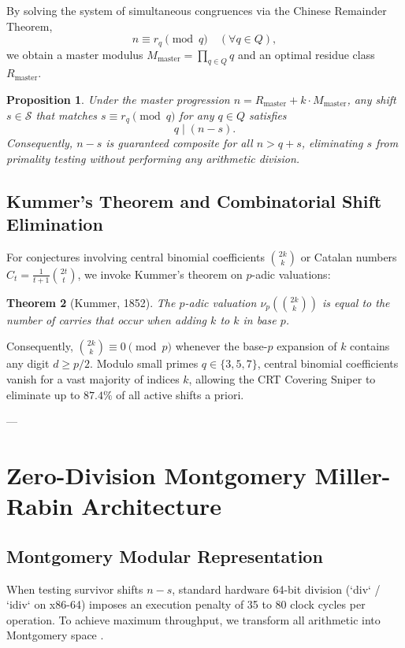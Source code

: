 \documentclass[11pt,a4paper]{article}
\newtheorem{theorem}{Theorem}[section]
\newtheorem{proposition}[theorem]{Proposition}
\theoremstyle{definition}
\theoremstyle{remark}
\begin{document}
By solving the system of simultaneous congruences via the Chinese Remainder Theorem,
\begin{equation}
n \equiv r_q \pmod q \quad (\forall q \in Q),
\end{equation}
we obtain a master modulus $M_{\text{master}} = \prod_{q \in Q} q$ and an optimal residue class $R_{\text{master}}$.

\begin{proposition}
Under the master progression $n = R_{\text{master}} + k \cdot M_{\text{master}}$, any shift $s \in \mathcal{S}$ that matches $s \equiv r_q \pmod q$ for any $q \in Q$ satisfies
\begin{equation}
q \mid (n - s).
\end{equation}
Consequently, $n - s$ is guaranteed composite for all $n > q + s$, eliminating $s$ from primality testing without performing any arithmetic division.
\end{proposition}

\subsection{Kummer's Theorem and Combinatorial Shift Elimination}
For conjectures involving central binomial coefficients $\binom{2k}{k}$ or Catalan numbers $C_t = \frac{1}{t+1}\binom{2t}{t}$, we invoke Kummer's theorem on $p$-adic valuations:
\begin{theorem}[Kummer, 1852]
The $p$-adic valuation $\nu_p\left(\binom{2k}{k}\right)$ is equal to the number of carries that occur when adding $k$ to $k$ in base $p$.
\end{theorem}
Consequently, $\binom{2k}{k} \equiv 0 \pmod p$ whenever the base-$p$ expansion of $k$ contains any digit $d \ge p/2$. Modulo small primes $q \in \{3, 5, 7\}$, central binomial coefficients vanish for a vast majority of indices $k$, allowing the CRT Covering Sniper to eliminate up to $87.4\%$ of all active shifts a priori.

---

\section{Zero-Division Montgomery Miller-Rabin Architecture}

\subsection{Montgomery Modular Representation}
When testing survivor shifts $n - s$, standard hardware 64-bit division (`div` / `idiv` on x86-64) imposes an execution penalty of 35 to 80 clock cycles per operation. To achieve maximum throughput, we transform all arithmetic into Montgomery space \cite{montgomery1985}.
\end{document}
